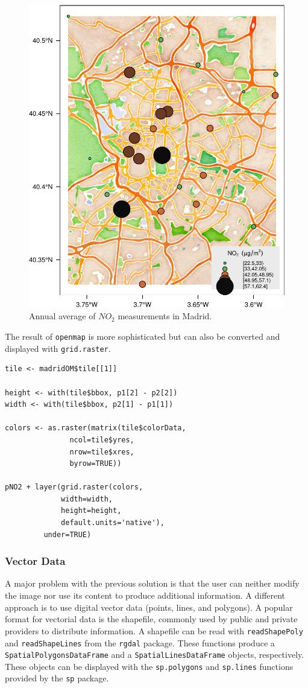 \documentclass[smallroyalvopaper]{memoir}
\begin{document}
\begin{figure}[htb]
\centering
\includegraphics[width=.9\linewidth]{figs/airMadrid_stamen.pdf}
\caption{\label{fig:airMadrid_stamen}Annual average of $NO_2$ measurements in Madrid.}
\end{figure}

The result of \texttt{openmap} is more sophisticated but can also be
converted and displayed with \texttt{grid.raster}.
\lstset{language=R,numbers=none}
\begin{lstlisting}
tile <- madridOM$tile[[1]]

height <- with(tile$bbox, p1[2] - p2[2])
width <- with(tile$bbox, p2[1] - p1[1])

colors <- as.raster(matrix(tile$colorData,
			   ncol=tile$yres,
			   nrow=tile$xres,
			   byrow=TRUE))

pNO2 + layer(grid.raster(colors,
			 width=width,
			 height=height,
			 default.units='native'),
	     under=TRUE)
\end{lstlisting}
\subsubsection{Vector Data}
\label{sec-1-4-2}
A major problem with the previous solution is that the user can
neither modify the image nor use its content to produce additional
information.  A different approach is to use digital vector data
(points, lines, and polygons). A popular format for vectorial data is
the shapefile, commonly used by public and private providers to
distribute information. A shapefile can be read with \texttt{readShapePoly}
and \texttt{readShapeLines} from the \texttt{rgdal} package. These functions produce
a \texttt{SpatialPolygonsDataFrame} and a \texttt{SpatialLinesDataFrame} objects,
respectively. These objects can be displayed with the \texttt{sp.polygons}
and \texttt{sp.lines} functions provided by the \texttt{sp} package.
\end{document}
